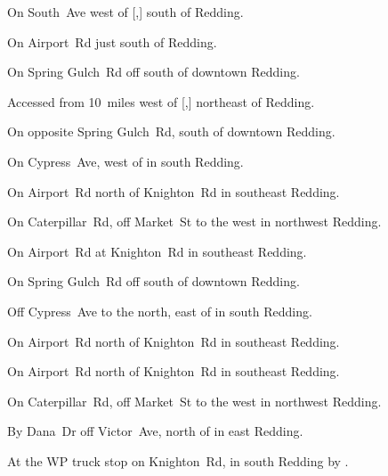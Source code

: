 
\begin{LocationList}

On South~Ave west of [,] south of Redding.

On  Airport~Rd just south of Redding.

On Spring Gulch~Rd off  south of downtown Redding.

Accessed from  10~miles west of [,] northeast of Redding.

On  opposite Spring Gulch~Rd, south of downtown Redding.

On Cypress~Ave, west of  in south Redding.

On Airport~Rd north of Knighton~Rd in southeast Redding.

On Caterpillar~Rd, off  Market~St to the west in northwest Redding.

\Location{\GarageHQ \Garage}
On Airport~Rd at Knighton~Rd in southeast Redding.

On Spring Gulch~Rd off  south of downtown Redding.

Off Cypress~Ave to the north, east of  in south Redding.

\Location{\RecruitmentAgency \Recruitment}
On Airport~Rd north of Knighton~Rd in southeast Redding.

On Airport~Rd north of Knighton~Rd in southeast Redding.

On Caterpillar~Rd, off  Market~St to the west in northwest Redding.

By Dana~Dr off Victor~Ave, north of  in east Redding.

At the WP truck stop on Knighton~Rd, in south Redding by .

\end{LocationList}
